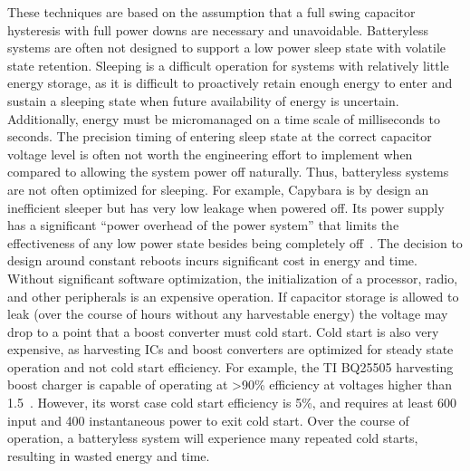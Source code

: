 These techniques are based on the assumption that a full swing capacitor hysteresis with full power downs are necessary and unavoidable. Batteryless systems are often not designed to support a low power sleep state with volatile state retention.
Sleeping is a difficult operation for systems with relatively little energy storage, as it is difficult to proactively retain enough energy to enter and sustain a sleeping state when future availability of energy is uncertain.
Additionally, energy must be micromanaged on a time scale of milliseconds to seconds.
The precision timing of entering sleep state at the correct capacitor voltage level is often not worth the engineering effort to implement when compared to allowing the system power off naturally. Thus, batteryless systems are not often optimized for sleeping.
For example, Capybara is by design an inefficient sleeper but has very low leakage when powered off.
Its power supply has a significant
``power overhead of the power system'' that limits the effectiveness of
any low power state besides being completely off~\cite{colinReconfigurable18}.
The decision to design around constant reboots incurs significant cost in energy and time. Without significant software optimization, the initialization of a processor, radio, and other peripherals is an expensive operation. If capacitor storage is allowed to leak (over the course of hours without any harvestable energy) the voltage may drop to a point that a boost converter must cold start.
Cold start is also very expensive, as harvesting ICs and boost converters are optimized for steady state operation and not cold start efficiency.
For example, the TI BQ25505 harvesting boost charger is capable of operating at \textgreater90\% efficiency at voltages higher than 1.5\ssi{\volt}~\cite{bq25505}.
However, its worst case cold start efficiency is 5\%, and requires at least 600\ssi{\milli\volt} input and 400\ssi{\milli\watt} instantaneous power to exit cold start.
Over the course of operation, a batteryless system will experience many repeated cold starts, resulting in wasted energy and time.


